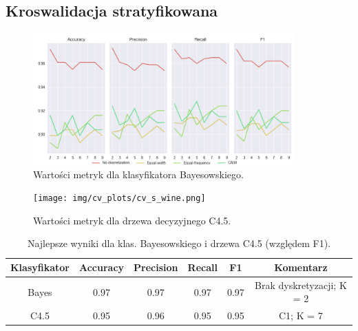 \subsection*{Kroswalidacja stratyfikowana}

\begin{figure}[H]
\center
    \includegraphics[width=0.9\textwidth]{img/cv_scores_stratifiedkfold/scoring_stratifiedkfold_wine.png}
    \caption{Wartości metryk dla klasyfikatora Bayesowskiego.}
\end{figure}

\begin{figure}[H]
    \center
    \texttt{[image: img/cv\_plots/cv\_s\_wine.png]}
    \caption{Wartości metryk dla drzewa decyzyjnego C4.5.}
\end{figure}

\begin{table}[H]
  \center
  \begin{tabular}{|c|c|c|c|c|c|}
    \hline
    Klasyfikator & Accuracy & Precision & Recall & F1 & Komentarz \\ \hline
    Bayes        & 0.97     & 0.97      & 0.97   & 0.97 & Brak dyskretyzacji; K = 2 \\ \hline
    C4.5         & 0.95     & 0.96      & 0.95   & 0.95 & C1; K = 7 \\ \hline
  \end{tabular}

  \caption{Najlepsze wyniki dla klas. Bayesowskiego i drzewa C4.5 (względem F1).}
\end{table}

